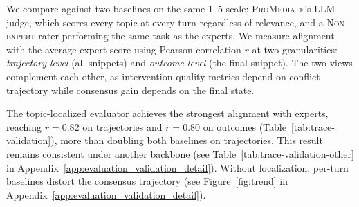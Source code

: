 We compare \algname{} against two baselines on the same 1--5 scale: \textsc{ProMediate}'s LLM judge, which scores every topic at every turn regardless of relevance, and a \textsc{Non-expert} rater performing the same task as the experts. We measure alignment with the average expert score using Pearson correlation $r$ at two granularities: \emph{trajectory-level} (all snippets) and \emph{outcome-level} (the final snippet). The two views complement each other, as intervention quality metrics depend on conflict trajectory while consensus gain depends on the final state.

The topic-localized evaluator achieves the strongest alignment with experts, reaching $r = 0.82$ on trajectories and $r = 0.80$ on outcomes (Table~\ref{tab:trace-validation}), more than doubling both baselines on trajectories. This result remains consistent under another backbone (see Table~\ref{tab:trace-validation-other} in Appendix~\ref{app:evaluation_validation_detail}). Without localization, per-turn baselines distort the consensus trajectory (see Figure~\ref{fig:trend} in Appendix~\ref{app:evaluation_validation_detail}).


